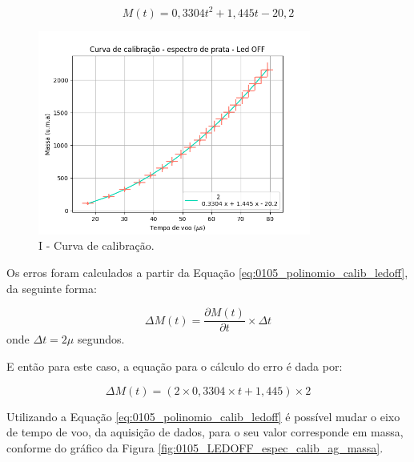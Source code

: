 \begin{equation}
\label{eq:0105_polinomio_calib_ledoff}
M(t) = 0,3304t^2 + 1,445t - 20,2
\end{equation}
\begin{figure}
  \centering  
  \includegraphics[width=0.8\textwidth]{exp_01/LEDOFF_curv+erro_calib.png}
  \caption{I - Curva de calibração.}
  \label{fig:1105_curva_calib_ledoff} 
\end{figure}

\clearpage

Os erros foram calculados a partir da Equação \ref{eq:0105_polinomio_calib_ledoff}, da seguinte forma:

\begin{equation}
    \Delta M(t) = \frac{\partial M(t)}{\partial t} \times \Delta t
\end{equation}
onde $\Delta t = 2 \mu $ segundos.

E então para este caso, a equação para o cálculo do erro é dada por:

\begin{equation}
    \Delta M(t) = (2\times 0,3304 \times t + 1,445) \times 2
\end{equation}


Utilizando a Equação \ref{eq:0105_polinomio_calib_ledoff} é possível mudar o eixo de tempo de voo, da aquisição de dados, para o seu valor corresponde em massa, conforme do gráfico da Figura \ref{fig:0105_LEDOFF_espec_calib_ag_massa}.




